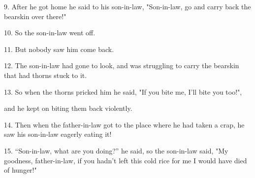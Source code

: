 9. After he got home he said to his son-in-law, "Son-in-law, go and carry
back the bearskin over there!"

10. So the son-in-law went off.

11. But nobody saw him come back.

12. The son-in-law had gone to look, and was struggling to carry the bearskin that
had thorns stuck to it.

13. So when the thorns pricked him he said, "If you bite me, I'll bite
you too!",

and he kept on biting them back violently.

14. Then when the father-in-law got to the place where he had taken a crap, he saw
his son-in-law eagerly eating it!

15. ``Son-in-law, what are you doing?'' he said, so the son-in-law
said, "My goodness, father-in-law, if you hadn't left this cold rice for
me I would have died of hunger!"

